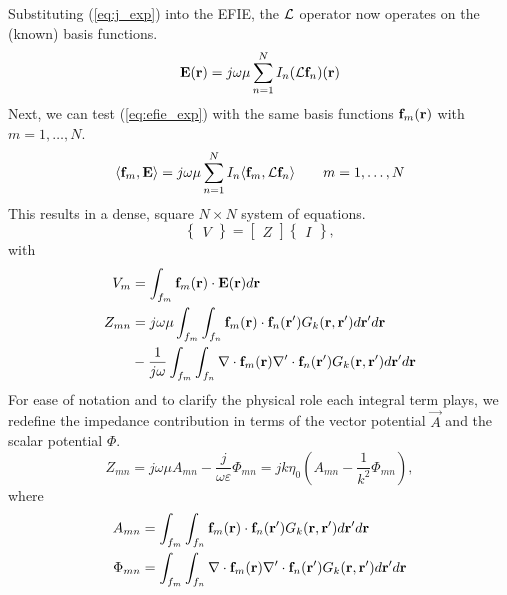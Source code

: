 Substituting (\ref{eq:j_exp}) into the EFIE, the $\mathcal{L}$ operator now operates on the (known) basis functions.
\begin{equation}
	\mathbf{E}(\mathbf{r}) = j\omega\mu \sum_{n = 1}^{N} I_n (\mathcal{L} \mathbf{f}_n)(\mathbf{r})
	\label{eq:efie_exp}
\end{equation}
Next, we can test (\ref{eq:efie_exp}) with the same basis functions $\mathbf{f}_m(\mathbf{r})$ with $m = 1, \dots, N$.
\begin{equation}
	\langle \mathbf{f}_m, \mathbf{E} \rangle = j\omega\mu \sum_{n = 1}^{N} I_n \langle \mathbf{f}_m, \mathcal{L} \mathbf{f}_n \rangle \qquad m = 1, \dots, N
\end{equation}
This results in a dense, square $N \times N$ system of equations.
\begin{equation}
	\begin{Bmatrix}
		V
	\end{Bmatrix} = \begin{bmatrix}
		Z
	\end{bmatrix} \begin{Bmatrix}
		I
	\end{Bmatrix},
	\label{eq:system}
\end{equation}
with
\begin{align*}
	V_m & = \int_{f_m} \mathbf{f}_m(\mathbf{r}) \cdot \mathbf{E}(\mathbf{r}) d\mathbf{r} \\
	Z_{mn} & = j\omega\mu \int_{f_m} \int_{f_n} \mathbf{f}_m(\mathbf{r}) \cdot \mathbf{f}_n(\mathbf{r}^\prime) G_k(\mathbf{r}, \mathbf{r}^\prime) d\mathbf{r}^\prime d\mathbf{r} \\
	 & - \frac{1}{j\omega} \int_{f_m} \int_{f_n} \nabla \cdot \mathbf{f}_m(\mathbf{r}) \nabla^\prime \cdot \mathbf{f}_n(\mathbf{r}^\prime) G_k(\mathbf{r}, \mathbf{r}^\prime) d\mathbf{r}^\prime d\mathbf{r}
\end{align*}
For ease of notation and to clarify the physical role each integral term plays, we redefine the impedance contribution in terms of the vector potential $\vec{A}$ and the scalar potential $\Phi$.
\begin{equation}
	Z_{mn} = j\omega\mu A_{mn} - \frac{j}{\omega\varepsilon} \Phi_{mn} = j k \eta_0 \left(A_{mn} - \frac{1}{k^2} \Phi_{mn} \right),
\end{equation}
where
\begin{align}
	A_{mn} & = \int_{f_m} \int_{f_n} \mathbf{f}_m(\mathbf{r}) \cdot \mathbf{f}_n(\mathbf{r}^\prime) G_k(\mathbf{r}, \mathbf{r}^\prime) d\mathbf{r}^\prime d\mathbf{r} \label{eq:Amn} \\
	\Phi_{mn} & = \int_{f_m} \int_{f_n} \nabla \cdot \mathbf{f}_m(\mathbf{r}) \nabla^\prime \cdot \mathbf{f}_n(\mathbf{r}^\prime) G_k(\mathbf{r}, \mathbf{r}^\prime) d\mathbf{r}^\prime d\mathbf{r} \label{eq:Pmn}
\end{align}

